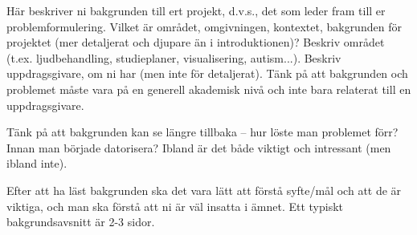 Här beskriver ni bakgrunden till ert projekt, d.v.s., det som leder fram till er problemformulering.  Vilket är området, omgivningen, kontextet, bakgrunden för projektet (mer detaljerat och djupare än i introduktionen)?  Beskriv området (t.ex. ljudbehandling, studieplaner, visualisering, autism...).  Beskriv uppdragsgivare, om ni har (men inte för detaljerat).  Tänk på att bakgrunden och problemet måste vara på en generell akademisk nivå och inte bara relaterat till en uppdragsgivare.

Tänk på att bakgrunden kan se längre tillbaka -- hur löste man problemet förr? Innan man började datorisera? Ibland är det både viktigt och intressant (men ibland inte).

Efter att ha läst bakgrunden ska det vara lätt att förstå syfte/mål och att de är viktiga, och man ska förstå att ni är väl insatta i ämnet.
Ett typiskt bakgrundsavsnitt är 2-3 sidor.

